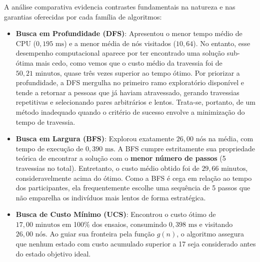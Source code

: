 \documentclass[12pt,a4paper]{article}
\begin{document}
%

A análise comparativa evidencia contrastes fundamentais na natureza e nas garantias 
oferecidas por cada família de algoritmos:

\begin{itemize}[leftmargin=1.5cm]
    \item \textbf{Busca em Profundidade (DFS)}: Apresentou o menor tempo médio de CPU 
    ($0{,}195\text{ ms}$) e a menor média de nós visitados ($10{,}64$). No entanto, esse 
    desempenho computacional aparece por ter encontrado uma solução sub-ótima mais cedo, 
    como vemos que o custo médio da travessia foi de $50{,}21\text{ minutos}$, quase três 
    vezes superior ao tempo ótimo. Por priorizar a profundidade, a DFS mergulha no 
    primeiro ramo exploratório disponível e tende a retornar a pessoas que já haviam 
    atravessado, gerando travessias repetitivas e selecionando pares arbitrários e 
    lentos. Trata-se, portanto, de um método inadequado quando o critério de sucesso 
    envolve a minimização do tempo de travessia.
    
    \item \textbf{Busca em Largura (BFS)}: Explorou exatamente $26{,}00\text{ nós}$ na 
    média, com tempo de execução de $0{,}390\text{ ms}$. A BFS cumpre estritamente sua 
    propriedade teórica de encontrar a solução com o \textbf{menor número de passos} 
    (5 travessias no total). Entretanto, o custo médio obtido foi de 
    $29{,}66\text{ minutos}$, consideravelmente acima do ótimo. Como a BFS é cega em 
    relação ao tempo dos participantes, ela frequentemente escolhe uma sequência de 
    5 passos que não emparelha os indivíduos mais lentos de forma estratégica.
    
    \item \textbf{Busca de Custo Mínimo (UCS)}: Encontrou o custo ótimo de 
    $17{,}00\text{ minutos}$ em 100\% dos ensaios, consumindo $0{,}398\text{ ms}$ e 
    visitando $26{,}00\text{ nós}$. Ao guiar sua fronteira pela função $g(n)$, 
    o algoritmo assegura que nenhum estado com custo acumulado superior a 17 seja 
    considerado antes do estado objetivo ideal.
    

\end{itemize}
\end{document}
